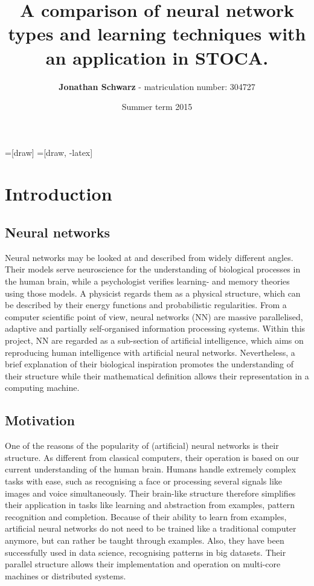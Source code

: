 \documentclass[10pt,a4paper,DIV=11]{scrreprt}
\title
{
     A comparison of neural network types and learning techniques with an application in STOCA\cite{DAN}.
}
\author
{
    \textbf{Jonathan Schwarz} - matriculation number: 304727
}
\date
{
    Summer term 2015
}
\begin{document}
=[draw]
=[draw, -latex] 


\maketitle
\thispagestyle{empty}
\newpage
{\large\tableofcontents}
\newpage

\chapter{Introduction}
\section{Neural networks}
Neural networks may be looked at and described from widely different angles. Their models serve neuroscience for the understanding of biological processes in the human brain, while a psychologist verifies learning- and memory theories using those models. A physicist regards them as a physical structure, which can be described by their energy functions and probabilistic regularities. From a computer scientific point of view, neural networks (NN) are massive parallelised, adaptive and partially self-organised information processing systems. \cite{NNGER}
Within this project, NN are regarded as a sub-section of artificial intelligence, which aims on reproducing human intelligence with artificial neural networks. Nevertheless, a brief explanation of their biological inspiration promotes the understanding of their structure while their mathematical definition allows their representation in a computing machine.
\section{Motivation}
One of the reasons of the popularity of (artificial) neural networks is their structure. As different from classical computers, their operation is based on our current understanding of the human brain.  Humans handle extremely complex tasks with ease, such as recognising a face or processing several signals like images and voice simultaneously. Their brain-like structure therefore simplifies their application in tasks like learning and abstraction from examples, pattern recognition and completion. Because of their ability to learn from examples, artificial neural networks do not need to be trained like a traditional computer anymore, but can rather be taught through examples. Also, they have been successfully used in data science, recognising patterns in big datasets. Their parallel structure allows their implementation and operation on multi-core machines or distributed systems. 
\end{document}
